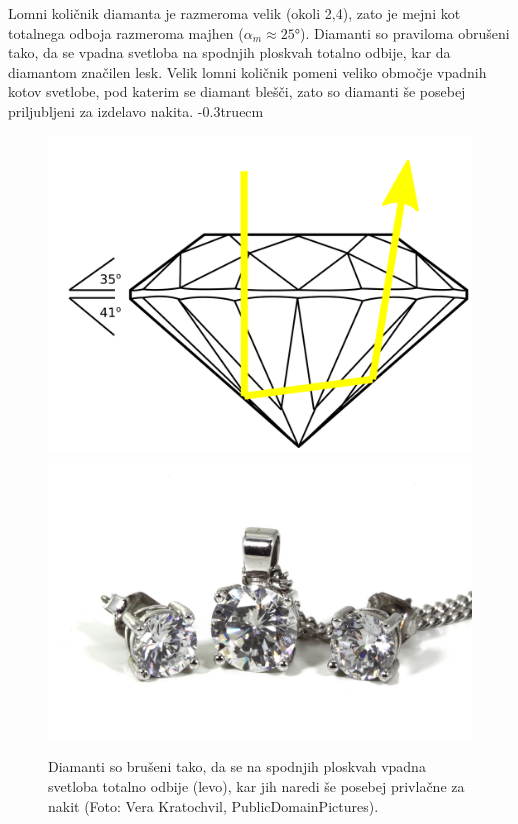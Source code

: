 \begin{remark}
Lomni količnik diamanta je razmeroma velik (okoli 2,4), zato je mejni kot 
totalnega odboja razmeroma majhen ($\alpha_m \approx 25\si{\degree}$). Diamanti so praviloma
obrušeni tako, da se vpadna svetloba na spodnjih ploskvah totalno odbije, kar da diamantom značilen
lesk. Velik lomni količnik pomeni veliko območje vpadnih kotov svetlobe, pod katerim se 
diamant blešči, zato so diamanti še posebej priljubljeni za izdelavo nakita.
\vglue-0.3truecm
\begin{figure}[!h]
\centering
\includegraphics[height=3.7truecm]{slike/04_diamant.png}\qquad
\includegraphics[height=3.7truecm]{slike/04_nakit.jpg}\hfill
\caption{Diamanti so brušeni tako, da se na spodnjih ploskvah vpadna svetloba totalno odbije (levo), 
kar jih naredi še posebej privlačne za nakit (Foto: Vera Kratochvil, PublicDomainPictures).}
\label{fig:04_diamanti}
\end{figure}
\end{remark}

